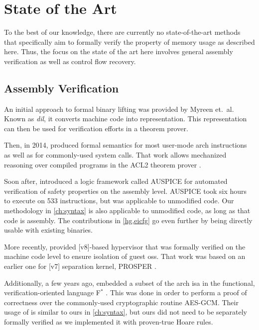 \section{State of the Art}
To the best of our knowledge, there are currently no state-of-the-art methods that specifically aim to formally verify the property of memory usage as described here.
Thus, the focus on the state of the art here involves general assembly verification as well as control flow recovery.

\subsection{Assembly Verification}
An initial approach to formal binary lifting was provided by Myreen et.\ al.
Known as \emph{\ac{dil}}, it converts machine code into  representation.
This representation can then be used for verification efforts in a theorem prover.

Then, in 2014, \textcite{goel2014syscalls,goelphd} produced formal semantics
for most user-mode \gls{arch} instructions as well as for commonly-used system calls.
That work allows mechanized reasoning over compiled programs in the ACL2 theorem prover \autocite{ACL2}.

Soon after, \textcite{tan2015auspice} introduced a logic framework called AUSPICE for automated verification of safety properties on the assembly level.
AUSPICE took six hours to execute on \num{533} instructions, but was applicable to unmodified code.
Our methodology in \cref{ch:syntax} is also applicable to unmodified code, as long as that code is assembly.
The contributions in \cref{hg,eicfg} go even further by being directly usable with existing binaries.

More recently, \textcite{baumann2016high} provided [v8]-based hypervisor that was formally verified on the machine code level to ensure isolation of guest \acp{os}.
That work was based on an earlier one for [v7] separation kernel, PROSPER \autocite{dam2013hypervisor,dam2013formal}.

Additionally, a few years ago, \textcite{fromherz2019verified} embedded a subset of the \gls{arch} \ac{isa} in the functional, verification-oriented language F$^*$ \autocite{fstar}.
This was done in order to perform a proof of correctness over the commonly-used cryptographic routine AES-GCM.
Their usage of  is similar to ours in \cref{ch:syntax}, but ours did not need to be separately formally verified as we implemented it with proven-true Hoare rules.

